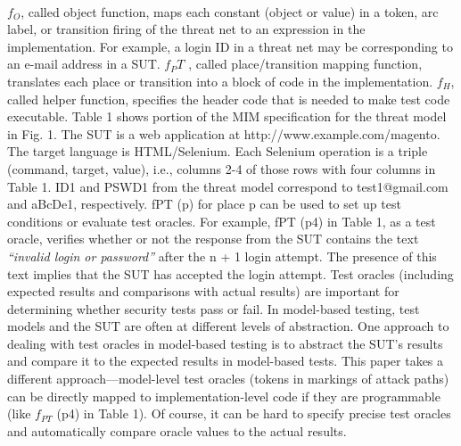 \paragraph{}
$f_O$, called object function, maps each constant (object or value) in a token, arc label, or transition firing of the threat net to an expression in the implementation. For example, a login ID in a threat net may be corresponding to an e-mail address in a SUT. $f_PT$ , called place/transition mapping function, translates each place or transition into a block of code in the implementation. $f_H$, called helper function, specifies the header code that is needed to make test code executable. Table 1 shows portion of the MIM specification for the threat model in Fig. 1. The SUT is a web application at http://www.example.com/magento. The target language is HTML/Selenium. Each Selenium operation is a triple (command, target, value), i.e., columns 2-4 of those rows with four columns in Table 1. ID1 and PSWD1 from the threat model correspond to test1@gmail.com and aBcDe1, respectively. fPT (p) for place p can be used to set up test conditions or evaluate test oracles. For example, fPT (p4) in Table 1, as a test oracle, verifies whether or not the response from the SUT contains the text \textit{“invalid login or password”} after the n + 1 login attempt. The presence of this text implies that the SUT has accepted the login attempt. Test oracles (including expected results and comparisons with actual
results) are important for determining whether security tests pass or fail. In model-based testing, test models and the SUT are often at different levels of abstraction. One approach to dealing with test oracles in model-based testing is to abstract the SUT’s results and compare it to the expected results in model-based tests. This paper takes a different approach—model-level test oracles (tokens in markings of attack paths) can be directly mapped to implementation-level
code if they are programmable (like $f_{PT}$ (p4) in Table 1). Of course, it can be hard to specify precise test oracles and automatically compare oracle values to the actual results.

